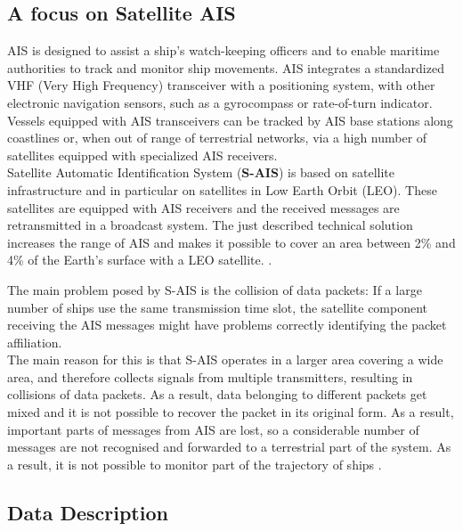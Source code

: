     \subsection{A focus on Satellite AIS}
    \label{sec:s-ais}
    AIS is designed to assist a ship's watch-keeping officers and to enable maritime authorities to track and monitor ship movements. AIS integrates a standardized VHF (Very High Frequency) transceiver with a positioning system, with other electronic navigation sensors, such as a gyrocompass or rate-of-turn indicator. Vessels equipped with AIS transceivers can be tracked by AIS base stations along coastlines or, when out of range of terrestrial networks, via a high number of satellites equipped with specialized AIS receivers. 
    \\
    Satellite Automatic Identification System (\textbf{S-AIS}) is based on satellite infrastructure and in particular on satellites in Low Earth Orbit (LEO). These satellites are equipped with AIS receivers and the received messages are retransmitted in a broadcast system.
    The just described technical solution increases the range of AIS and makes it possible to cover an area between 2\% and 4\% of the Earth's surface with a LEO satellite. \cite{dbscan_ais}.
    
    The main problem posed by S-AIS is the collision of data packets: If a large number of ships use the same transmission time slot, the satellite component receiving the AIS messages might have problems correctly identifying the packet affiliation.
    \\
    The main reason for this is that S-AIS operates in a larger area covering a wide area, and therefore collects signals from multiple transmitters, resulting in collisions of data packets.
    As a result, data belonging to different packets get mixed and it is not possible to recover the packet in its original form. As a result, important parts of messages from AIS are lost, so a considerable number of messages are not recognised and forwarded to a terrestrial part of the system. As a result, it is not possible to monitor part of the trajectory of ships \cite{dbscan_ais}.
    

    \subsection{Data Description}
    

